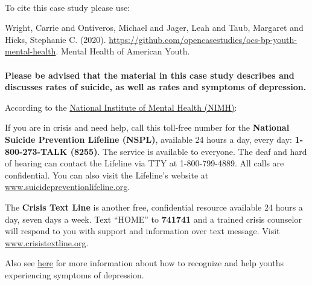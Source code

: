 \documentclass[
]{article}
\begin{document}
\hypertarget{section-6}{%
\paragraph{}\label{section-6}}

To cite this case study please use:

Wright, Carrie and Ontiveros, Michael and Jager, Leah and Taub, Margaret
and Hicks, Stephanie C. (2020).
\url{https://github.com/opencasestudies/ocs-bp-youth-mental-health}.
Mental Health of American Youth.

\hypertarget{section-7}{%
\paragraph{}\label{section-7}}

\hypertarget{section-8}{%
\paragraph{}\label{section-8}}

\textbf{Please be advised that the material in this case study describes
and discusses rates of suicide, as well as rates and symptoms of
depression.}

According to the
\href{https://www.nimh.nih.gov/health/publications/teen-depression/index.shtml}{National
Institute of Mental Health (NIMH)}:

If you are in crisis and need help, call this toll-free number for the
\textbf{National Suicide Prevention Lifeline (NSPL)}, available 24 hours
a day, every day: \textbf{1-800-273-TALK (8255)}. The service is
available to everyone. The deaf and hard of hearing can contact the
Lifeline via TTY at 1-800-799-4889. All calls are confidential. You can
also visit the Lifeline's website at
\url{www.suicidepreventionlifeline.org}.

The \textbf{Crisis Text Line} is another free, confidential resource
available 24 hours a day, seven days a week. Text ``HOME'' to
\textbf{741741} and a trained crisis counselor will respond to you with
support and information over text message. Visit
\url{www.crisistextline.org}.

Also see \href{https://www.mhanational.org/depression-teens-0}{here} for
more information about how to recognize and help youths experiencing
symptoms of depression.

\hypertarget{section-9}{%
\paragraph{}\label{section-9}}
\end{document}
